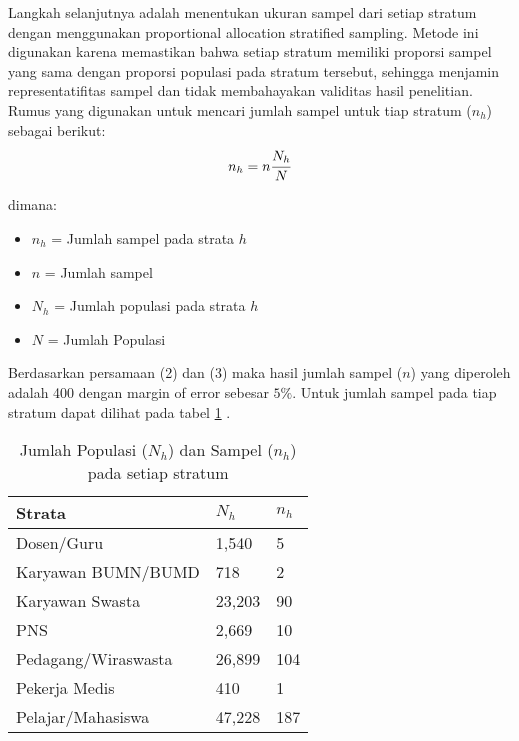 \documentclass{article}
\begin{document}
\begin{enumerate}
    Langkah selanjutnya adalah menentukan ukuran sampel dari setiap stratum dengan menggunakan proportional allocation stratified sampling. Metode ini digunakan karena  memastikan bahwa setiap stratum memiliki proporsi sampel yang sama dengan proporsi populasi pada stratum tersebut, sehingga menjamin representatifitas sampel dan tidak membahayakan validitas hasil penelitian. Rumus yang digunakan untuk mencari jumlah sampel untuk tiap stratum ($n_{h}$) sebagai berikut:
    \begin{align}
        n_{h} = n \cfrac{N_{h}}{N}
    \end{align} 

    dimana:
    \begin{itemize}
        \item $n_{h}$ = Jumlah sampel pada strata $h$
        \item $n$ = Jumlah sampel
        \item $N_{h}$ = Jumlah populasi pada strata $h$
        \item $N$ = Jumlah Populasi 
    \end{itemize}

    Berdasarkan persamaan (2) dan (3) maka hasil jumlah sampel ($n$) yang diperoleh adalah 400 dengan margin of error sebesar $5\%$. Untuk jumlah sampel pada tiap stratum dapat dilihat pada tabel \ref{tabel:sample_stratum} .
    \begin{table}[ht]
        \centering
        \caption{Jumlah Populasi ($N_{h}$) dan Sampel ($n_{h}$) pada setiap stratum}
        \label{tabel:sample_stratum}
        \begin{tabular}{|p{6cm}|p{3cm}|p{3cm}|}
        \hline
        \textbf{Strata} & \textbf{$N_{h}$} & \textbf{$n_{h}$} \\ \hline
        Dosen/Guru & 1,540 & 5 \\ \hline
        Karyawan BUMN/BUMD & 718 & 2 \\ \hline
        Karyawan Swasta & 23,203  & 90  \\ \hline
        PNS & 2,669  & 10  \\ \hline
        Pedagang/Wiraswasta & 26,899	 & 104  \\ \hline
        Pekerja Medis & 410 & 1  \\ \hline
        Pelajar/Mahasiswa & 47,228  & 187  \\ \hline
        \end{tabular}
    \end{table}

\end{enumerate}
\end{document}
